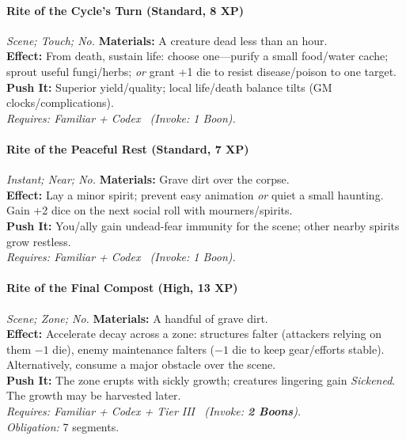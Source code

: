 \paragraph{Rite of the Cycle's Turn (Standard, 8 XP)} \emph{Scene; Touch; No.}
\textbf{Materials:} A creature dead less than an hour. \\
\textbf{Effect:} From death, sustain life: choose one—purify a small food/water cache; sprout useful fungi/herbs; \emph{or} grant +1 die to resist disease/poison to one target. \\
\textbf{Push It:} Superior yield/quality; local life/death balance tilts (GM clocks/complications). \\
\emph{Requires: Familiar + Codex \ (\textit{Invoke:} 1 Boon).}

\paragraph{Rite of the Peaceful Rest (Standard, 7 XP)} \emph{Instant; Near; No.}
\textbf{Materials:} Grave dirt over the corpse. \\
\textbf{Effect:} Lay a minor spirit; prevent easy animation \emph{or} quiet a small haunting. Gain +2 dice on the next social roll with mourners/spirits. \\
\textbf{Push It:} You/ally gain undead-fear immunity for the scene; other nearby spirits grow restless. \\
\emph{Requires: Familiar + Codex \ (\textit{Invoke:} 1 Boon).}

\paragraph{Rite of the Final Compost (High, 13 XP)} \emph{Scene; Zone; No.}
\textbf{Materials:} A handful of grave dirt. \\
\textbf{Effect:} Accelerate decay across a zone: structures falter (attackers relying on them $-1$ die), enemy maintenance falters ($-1$ die to keep gear/efforts stable). Alternatively, consume a major obstacle over the scene. \\
\textbf{Push It:} The zone erupts with sickly growth; creatures lingering gain \emph{Sickened}. The growth may be harvested later. \\
\emph{Requires: Familiar + Codex + Tier III \ (\textit{Invoke:} \textbf{2 Boons}).} \\
\emph{Obligation:} 7 segments.

